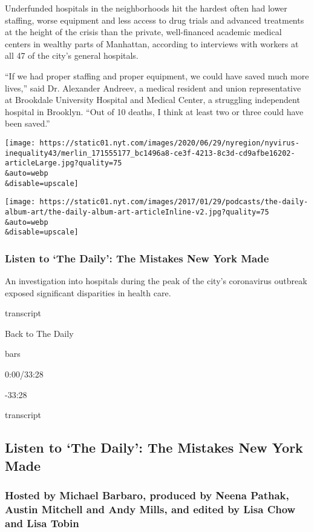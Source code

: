 Underfunded hospitals in the neighborhoods hit the hardest often had
lower staffing, worse equipment and less access to drug trials and
advanced treatments at the height of the crisis than the private,
well-financed academic medical centers in wealthy parts of Manhattan,
according to interviews with workers at all 47 of the city's general
hospitals.

``If we had proper staffing and proper equipment, we could have saved
much more lives,'' said Dr. Alexander Andreev, a medical resident and
union representative at Brookdale University Hospital and Medical
Center, a struggling independent hospital in Brooklyn. ``Out of 10
deaths, I think at least two or three could have been saved.''

\texttt{[image: https://static01.nyt.com/images/2020/06/29/nyregion/nyvirus-inequality43/merlin\_171555177\_bc1496a8-ce3f-4213-8c3d-cd9afbe16202-articleLarge.jpg?quality=75\\\&auto=webp\\\&disable=upscale]}

\texttt{[image: https://static01.nyt.com/images/2017/01/29/podcasts/the-daily-album-art/the-daily-album-art-articleInline-v2.jpg?quality=75\\\&auto=webp\\\&disable=upscale]}

\hypertarget{listen-to-the-daily-the-mistakes-new-york-made}{%
\subsubsection{Listen to `The Daily': The Mistakes New York
Made}\label{listen-to-the-daily-the-mistakes-new-york-made}}

An investigation into hospitals during the peak of the city's
coronavirus outbreak exposed significant disparities in health care.

transcript

Back to The Daily

bars

0:00/33:28

-33:28

transcript

\hypertarget{listen-to-the-daily-the-mistakes-new-york-made-1}{%
\subsection{Listen to `The Daily': The Mistakes New York
Made}\label{listen-to-the-daily-the-mistakes-new-york-made-1}}

\hypertarget{hosted-by-michael-barbaro-produced-by-neena-pathak-austin-mitchell-and-andy-mills-and-edited-by-lisa-chow-and-lisa-tobin}{%
\subsubsection{Hosted by Michael Barbaro, produced by Neena Pathak,
Austin Mitchell and Andy Mills, and edited by Lisa Chow and Lisa
Tobin}\label{hosted-by-michael-barbaro-produced-by-neena-pathak-austin-mitchell-and-andy-mills-and-edited-by-lisa-chow-and-lisa-tobin}}

